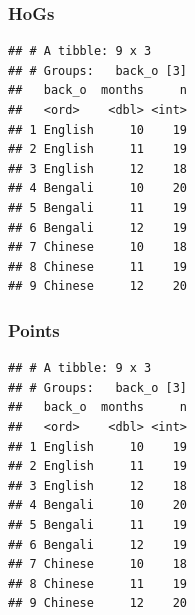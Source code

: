 \documentclass[]{article}
\newenvironment{Shaded}{\begin{snugshade}}{\end{snugshade}}
\newcommand{\DataTypeTok}[1]{\textcolor[rgb]{0.13,0.29,0.53}{#1}}
\newcommand{\KeywordTok}[1]{\textcolor[rgb]{0.13,0.29,0.53}{\textbf{#1}}}
\newcommand{\NormalTok}[1]{#1}
\newcommand{\OperatorTok}[1]{\textcolor[rgb]{0.81,0.36,0.00}{\textbf{#1}}}
\newcommand{\StringTok}[1]{\textcolor[rgb]{0.31,0.60,0.02}{#1}}
\begin{document}
\hypertarget{hogs-1}{%
\subsubsection{HoGs}\label{hogs-1}}

\begin{Shaded}
\end{Shaded}

\begin{verbatim}
## # A tibble: 9 x 3
## # Groups:   back_o [3]
##   back_o  months     n
##   <ord>    <dbl> <int>
## 1 English     10    19
## 2 English     11    19
## 3 English     12    18
## 4 Bengali     10    20
## 5 Bengali     11    19
## 6 Bengali     12    19
## 7 Chinese     10    18
## 8 Chinese     11    19
## 9 Chinese     12    20
\end{verbatim}

\hypertarget{points}{%
\subsubsection{Points}\label{points}}

\begin{Shaded}
\end{Shaded}

\begin{verbatim}
## # A tibble: 9 x 3
## # Groups:   back_o [3]
##   back_o  months     n
##   <ord>    <dbl> <int>
## 1 English     10    19
## 2 English     11    19
## 3 English     12    18
## 4 Bengali     10    20
## 5 Bengali     11    19
## 6 Bengali     12    19
## 7 Chinese     10    18
## 8 Chinese     11    19
## 9 Chinese     12    20
\end{verbatim}
\end{document}
